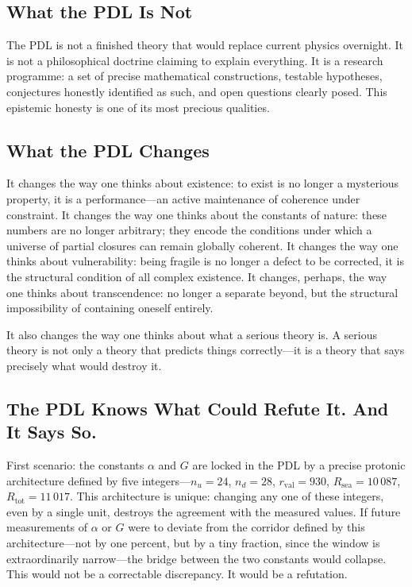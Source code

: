 \documentclass[12pt, a4paper, openright]{book}
\begin{document}
\subsection*{What the PDL Is Not}

The PDL is not a finished theory that would replace current physics overnight. It is not a philosophical doctrine claiming to explain everything. It is a research programme: a set of precise mathematical constructions, testable hypotheses, conjectures honestly identified as such, and open questions clearly posed. This epistemic honesty is one of its most precious qualities.

\subsection*{What the PDL Changes}

It changes the way one thinks about existence: to exist is no longer a mysterious property, it is a performance---an active maintenance of coherence under constraint. It changes the way one thinks about the constants of nature: these numbers are no longer arbitrary; they encode the conditions under which a universe of partial closures can remain globally coherent. It changes the way one thinks about vulnerability: being fragile is no longer a defect to be corrected, it is the structural condition of all complex existence. It changes, perhaps, the way one thinks about transcendence: no longer a separate beyond, but the structural impossibility of containing oneself entirely.

\medskip

It also changes the way one thinks about what a serious theory is. A serious theory is not only a theory that predicts things correctly---it is a theory that says precisely what would destroy it.

\subsection*{The PDL Knows What Could Refute It. And It Says So.}

First scenario: the constants $\alpha$ and $G$ are locked in the PDL by a precise protonic architecture defined by five integers---$n_u = 24$, $n_d = 28$, $r_\text{val} = 930$, $R_\text{sea} = 10\,087$, $R_\text{tot} = 11\,017$. This architecture is unique: changing any one of these integers, even by a single unit, destroys the agreement with the measured values. If future measurements of $\alpha$ or $G$ were to deviate from the corridor defined by this architecture---not by one percent, but by a tiny fraction, since the window is extraordinarily narrow---the bridge between the two constants would collapse. This would not be a correctable discrepancy. It would be a refutation.
\end{document}
